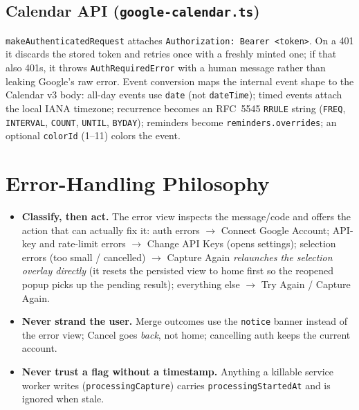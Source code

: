 \documentclass[11pt]{article}
\begin{document}
\subsection{Calendar API (\texttt{google-calendar.ts})}

\texttt{makeAuthenticatedRequest} attaches \texttt{Authorization: Bearer
<token>}. On a 401 it discards the stored token and retries once with a
freshly minted one; if that also 401s, it throws
\texttt{AuthRequiredError} with a human message rather than leaking Google's
raw error. Event conversion maps the internal event shape to the Calendar v3
body: all-day events use \texttt{date} (not \texttt{dateTime}); timed events
attach the local IANA timezone; recurrence becomes an RFC~5545
\texttt{RRULE} string (\texttt{FREQ}, \texttt{INTERVAL}, \texttt{COUNT},
\texttt{UNTIL}, \texttt{BYDAY}); reminders become
\texttt{reminders.overrides}; an optional \texttt{colorId} (1--11) colors the
event.

\section{Error-Handling Philosophy}

\begin{itemize}
  \item \textbf{Classify, then act.} The error view inspects the message/code
        and offers the action that can actually fix it: auth errors
        $\rightarrow$ Connect Google Account; API-key and rate-limit errors
        $\rightarrow$ Change API Keys (opens settings); selection errors
        (too small / cancelled) $\rightarrow$ Capture Again \emph{relaunches
        the selection overlay directly} (it resets the persisted view to
        home first so the reopened popup picks up the pending result);
        everything else $\rightarrow$ Try Again / Capture Again.
  \item \textbf{Never strand the user.} Merge outcomes use the
        \texttt{notice} banner instead of the error view; Cancel goes
        \emph{back}, not home; cancelling auth keeps the current account.
  \item \textbf{Never trust a flag without a timestamp.} Anything a killable
        service worker writes (\texttt{processingCapture}) carries
        \texttt{processingStartedAt} and is ignored when stale.
\end{itemize}

\end{document}
